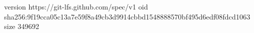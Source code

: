 version https://git-lfs.github.com/spec/v1
oid sha256:9f19cca05c13a7e59f8a49cb3d9914cbbd1548888570bf495d6edf08fdcd1063
size 349692

